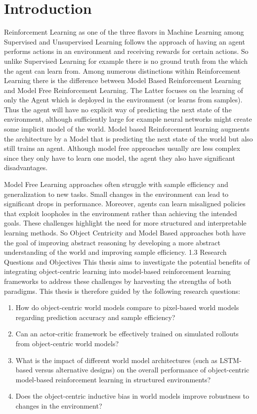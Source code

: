 \documentclass[
	english,
	ruledheaders=section,
	class=report,
	thesis={type=master},
	accentcolor=9c,
	custommargins=true,
	marginpar=false,
	parskip=half-,
	fontsize=11pt,
]{tudapub}
\begin{document}
\chapter{Introduction}
\label{chap:introduction}

Reinforcement Learning as one of the three flavors in Machine Learning among
Supervised and Unsupervised Learning follows the approach of having an agent
performs actions in an environment and receiving rewards for certain actions.
So unlike Supervised Learning for example there is no ground truth from the
which the agent can learn from. Among numerous distinctions within
Reinforcement Learning there is the difference between Model Based
Reinforcement Learning and Model Free Reinforcement Learning. The Latter
focuses on the learning of only the Agent which is deployed in the environment
(or learns from samples). Thus the agent will have no explicit way of
predicting the next state of the environment, although sufficiently large for
example neural networks might create some implicit model of the world. Model
based Reinforcement learning augments the architecture by a Model that is
predicting the next state of the world but also still trains an agent. Although
model free approaches usually are less complex since they only have to learn
one model, the agent they also have significant disadvantages.

Model Free Learning approaches often struggle with sample efficiency and
generalization to new tasks. Small changes in the environment can lead to
significant drops in performance. Moreover, agents can learn misaligned
policies that exploit loopholes in the environment rather than achieving the
intended goals. These challenges highlight the need for more structured and
interpretable learning methods. So Object Centricity and Model Based approaches
both have the goal of improving abstract reasoning by developing a more
abstract understanding of the world and improving sample efficiency. 1.3
Research Questions and Objectives This thesis aims to investigate the potential
benefits of integrating object-centric learning into model-based reinforcement
learning frameworks to address these challenges by harvesting the strengths of
both paradigms. This thesis is therefore guided by the following research
questions:
\begin{enumerate}
	\item How do object-centric world models compare to pixel-based world models
	      regarding prediction accuracy and sample efficiency?
	\item Can an actor-critic framework be effectively trained on simulated rollouts from
	      object-centric world models?
	\item What is the impact of different world model architectures (such as LSTM-based
	      versus alternative designs) on the overall performance of object-centric
	      model-based reinforcement learning in structured environments?
	\item Does the object-centric inductive bias in world models improve robustness to
	      changes in the environment?
\end{enumerate}
\end{document}
